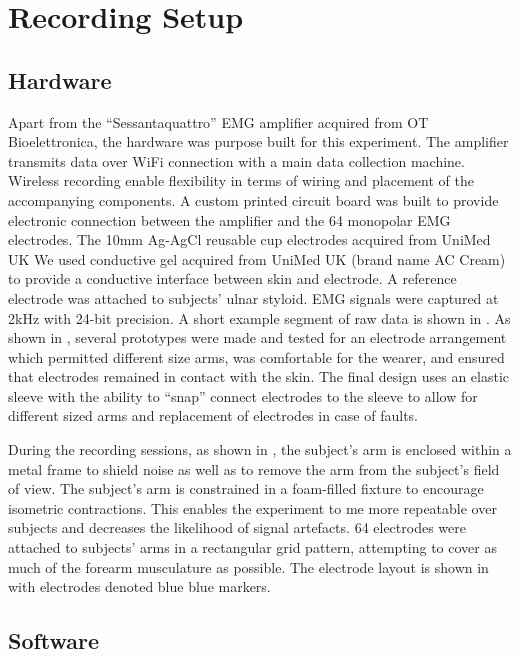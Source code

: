 \documentclass[../main.tex]{subfiles}
\begin{document}
\section{Recording Setup}\label{sec:setup}

\subsection{Hardware}

Apart from the ``Sessantaquattro'' EMG amplifier acquired from OT Bioelettronica, the hardware was purpose built for this experiment. The amplifier transmits data over WiFi connection with a main data collection machine. Wireless recording enable flexibility in terms of wiring and placement of the accompanying components. A custom printed circuit board was built to provide electronic connection between the amplifier and the 64 monopolar EMG electrodes. The 10mm Ag-AgCl reusable cup electrodes acquired from UniMed UK We used conductive gel acquired from UniMed UK (brand name AC Cream) to provide a conductive interface between skin and electrode. A reference electrode was attached to subjects' ulnar styloid. EMG signals were captured at 2kHz with 24-bit precision. A short example segment of raw data is shown in . As shown in , several prototypes were made and tested for an electrode arrangement which permitted different size arms, was comfortable for the wearer, and ensured that electrodes remained in contact with the skin. The final design uses an elastic sleeve with the ability to ``snap'' connect electrodes to the sleeve to allow for different sized arms and replacement of electrodes in case of faults. 

During the recording sessions, as shown in , the subject's arm is enclosed within a metal frame to shield noise as well as to remove the arm from the subject's field of view. The subject's arm is constrained in a foam-filled fixture to encourage isometric contractions. This enables the experiment to me more repeatable over subjects and decreases the likelihood of signal artefacts. 64 electrodes were attached to subjects' arms in a rectangular grid pattern, attempting to cover as much of the forearm musculature as possible. The electrode layout is shown in  with electrodes denoted blue blue markers.

\subsection{Software}
\end{document}
